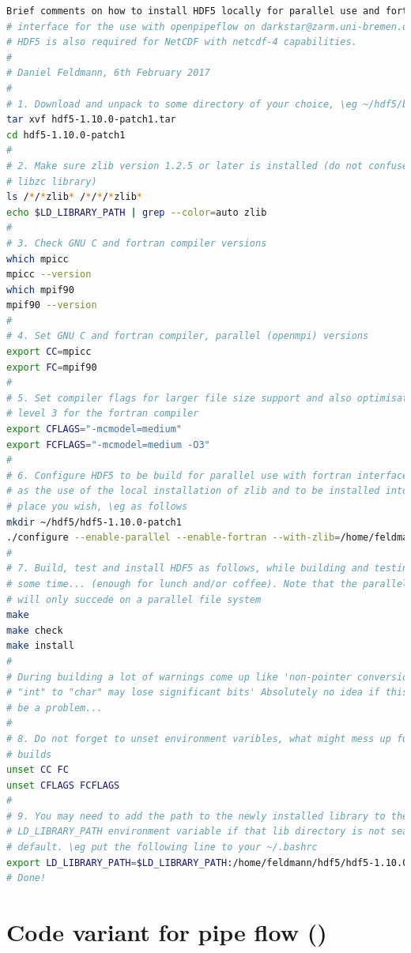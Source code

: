 \documentclass[a4paper, 11pt, DIV=11]{scrartcl}
\begin{document}
\begin{lstlisting}[language=bash]
 Brief comments on how to install HDF5 locally for parallel use and fortran
# interface for the use with openpipeflow on darkstar@zarm.uni-bremen.de
# HDF5 is also required for NetCDF with netcdf-4 capabilities.
#
# Daniel Feldmann, 6th February 2017
# 
# 1. Download and unpack to some directory of your choice, \eg ~/hdf5/build/.
tar xvf hdf5-1.10.0-patch1.tar
cd hdf5-1.10.0-patch1
#
# 2. Make sure zlib version 1.2.5 or later is installed (do not confuse with
# libzc library)
ls /*/*zlib* /*/*/*zlib*
echo $LD_LIBRARY_PATH | grep --color=auto zlib
#
# 3. Check GNU C and fortran compiler versions
which mpicc
mpicc --version
which mpif90
mpif90 --version
#
# 4. Set GNU C and fortran compiler, parallel (openmpi) versions
export CC=mpicc
export FC=mpif90
#
# 5. Set compiler flags for larger file size support and also optimisation
# level 3 for the fortran compiler
export CFLAGS="-mcmodel=medium"
export FCFLAGS="-mcmodel=medium -O3"
#
# 6. Configure HDF5 to be build for parallel use with fortran interface, as well
# as the use of the local installation of zlib and to be installed into some
# place you wish, \eg as follows
mkdir ~/hdf5/hdf5-1.10.0-patch1
./configure --enable-parallel --enable-fortran --with-zlib=/home/feldmann/zlib/zlib-1.2.11 --prefix=/home/feldmann/hdf5/hdf5-1.10.0-patch1
#
# 7. Build, test and install HDF5 as follows, while building and testing take quite
# some time... (enough for lunch and/or coffee). Note that the parallel tests
# will only succede on a parallel file system
make
make check
make install
#
# During building a lot of warnings come up like 'non-pointer conversion from
# "int" to "char" may lose significant bits' Absolutely no idea if this might
# be a problem...
#
# 8. Do not forget to unset environment varibles, what might mess up future
# builds
unset CC FC
unset CFLAGS FCFLAGS
#
# 9. You may need to add the path to the newly installed library to the
# LD_LIBRARY_PATH environment variable if that lib directory is not searched by
# default. \eg put the following line to your ~/.bashrc
export LD_LIBRARY_PATH=$LD_LIBRARY_PATH:/home/feldmann/hdf5/hdf5-1.10.0-patch1/lib
# Done!
\end{lstlisting}

\section{Code variant for pipe flow (\nsp)}
\label{sec:nsPipe}
\end{document}
